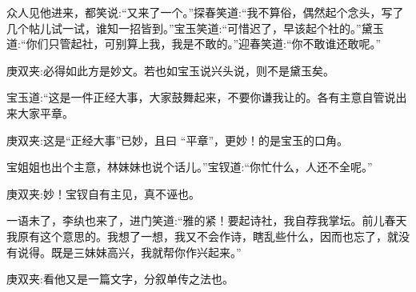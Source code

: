\begin{parag}
    众人见他进来，都笑说:“又来了一个。”探春笑道:“我不算俗，偶然起个念头，写了几个帖儿试一试，谁知一招皆到。”宝玉笑道:“可惜迟了，早该起个社的。”黛玉道:“你们只管起社，可别算上我，我是不敢的。”迎春笑道:“你不敢谁还敢呢。”\begin{note}庚双夹:必得如此方是妙文。若也如宝玉说兴头说，则不是黛玉矣。\end{note}宝玉道:“这是一件正经大事，大家鼓舞起来，不要你谦我让的。各有主意自管说出来大家平章。\begin{note}庚双夹:这是“正经大事”已妙，且曰 “平章”，更妙！的是宝玉的口角。\end{note}宝姐姐也出个主意，林妹妹也说个话儿。”宝钗道:“你忙什么，人还不全呢。”\begin{note}庚双夹:妙！宝钗自有主见，真不诬也。\end{note}一语未了，李纨也来了，进门笑道:“雅的紧！要起诗社，我自荐我掌坛。前儿春天我原有这个意思的。我想了一想，我又不会作诗，瞎乱些什么，因而也忘了，就没有说得。既是三妹妹高兴，我就帮你作兴起来。”\begin{note}庚双夹:看他又是一篇文字，分叙单传之法也。\end{note}
\end{parag}


